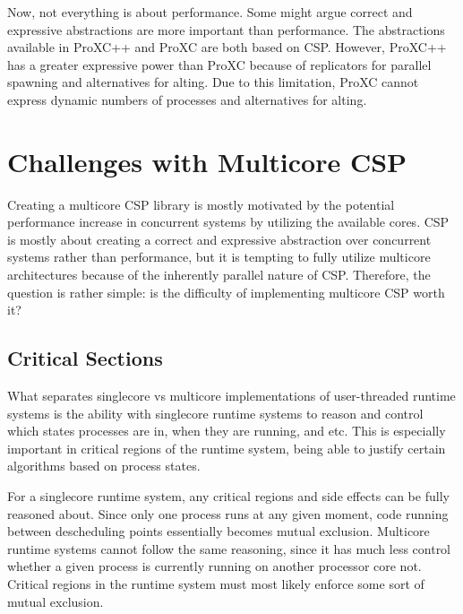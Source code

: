 Now, not everything is about performance. Some might argue correct and expressive abstractions are more important than performance. The abstractions available in ProXC++ and ProXC are both based on CSP. However, ProXC++ has a greater expressive power than ProXC because of replicators for parallel spawning and alternatives for alting. Due to this limitation, ProXC cannot express dynamic numbers of processes and alternatives for alting. 


\chapter{Challenges with Multicore CSP}
\label{ch:difficulty_multicore_csp}

Creating a multicore CSP library is mostly motivated by the potential performance increase in concurrent systems by utilizing the available cores. CSP is mostly about creating a correct and expressive abstraction over concurrent systems rather than performance, but it is tempting to fully utilize multicore architectures because of the inherently parallel nature of CSP. Therefore, the question is rather simple: is the difficulty of implementing multicore CSP worth it?

\section{Critical Sections}

What separates singlecore vs multicore implementations of user\hyp{}threaded runtime systems is the ability with singlecore runtime systems to reason and control which states processes are in, when they are running, and etc. This is especially important in critical regions of the runtime system, being able to justify certain algorithms based on process states.

For a singlecore runtime system, any critical regions and side effects can be fully reasoned about. Since only one process runs at any given moment, code running between descheduling points essentially becomes mutual exclusion. Multicore runtime systems cannot follow the same reasoning, since it has much less control whether a given process is currently running on another processor core not. Critical regions in the runtime system must most likely enforce some sort of mutual exclusion. 

